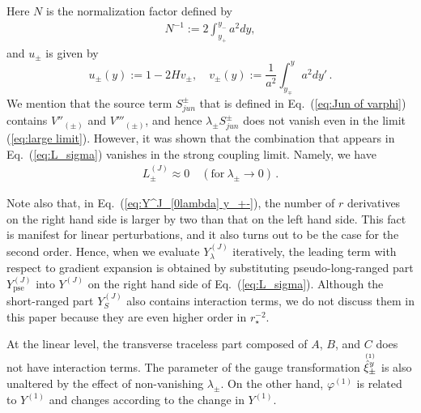 \documentclass[a4paper,showpacs,preprintnumbers,amsmath,amssymb]{revtex4}
\begin{document}
Here $N$ is the normalization factor defined by 
\begin{eqnarray}
N^{-1} := 2\int_{y_{+}}^{y_{-}} a^2 dy,  
\label{eq:N}
\end{eqnarray}
and $u_\pm$ is given by 
\begin{equation}
 u_{\pm}(y) :=1-2 H v_{\pm}, 
\quad
    v_{\pm}(y) :=\frac{1}{a ^2}\int_{y_{\mp}}^y a^2 dy' \,.
    \label{eq:def. v}
\end{equation}
We mention that the source term $S^{\pm}_{jun}$ that is defined in Eq.~(\ref{eq:Jun of varphi}) contains $V''_{(\pm)}$ and $V'''_{(\pm)}$, and hence $\lambda_\pm S^\pm_{jun}$ does not vanish even in the limit (\ref{eq:large limit}). However, it was shown that the combination that appears in Eq.~(\ref{eq:L_sigma}) vanishes in the strong coupling limit. Namely, we have 
\begin{eqnarray}
    L^{(J)}_{ \pm} \approx 0 \quad (\mathrm{for~} \lambda_\pm \to 0 )\,. 
\label{eq:L=0}
\end{eqnarray}

Note also that, in Eq.~(\ref{eq:Y^J_[0lambda] y_+-}), the number of $r$ derivatives on the right hand side is larger by two than that on the left hand side. 
This fact is manifest for linear perturbations, and it also turns out to be the case for the second order. Hence, when we evaluate $Y_{\lambda}^{(J)}$ iteratively, the leading term with respect to gradient expansion is obtained by substituting pseudo-long-ranged part 
$Y_{\mathrm{pse}}^{(J)}$ into  $Y^{(J)}$ on the right hand side of Eq.~(\ref{eq:L_sigma}).  Although the short-ranged part $Y_S^{(J)}$ also contains interaction terms, we do not discuss them in this paper because they are even higher order in $r_{\star}^{-2}$. 


At the linear level, the transverse traceless part composed of 
$A$, $B$, and $C$ does not have interaction terms. 
The parameter of the gauge transformation $\stackrel{\scriptscriptstyle {(1)}}{\hat\xi^y_\pm}$ is also unaltered by the effect of non-vanishing $\lambda_\pm$.  
On the other hand, $\varphi^{(1)}$ is related to $Y^{(1)}$ and changes according to the change in $Y^{(1)}$. 
\end{document}
